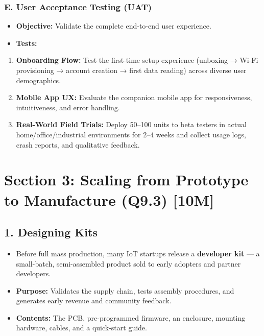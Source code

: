 \subsubsection{E. User Acceptance Testing (UAT)}
\begin{itemize}
  \item   \textbf{Objective:} Validate the complete end-to-end user experience.
  \item   \textbf{Tests:}
\end{itemize}
\begin{enumerate}
  \item \textbf{Onboarding Flow:} Test the first-time setup experience (unboxing → Wi-Fi provisioning → account creation → first data reading) across diverse user demographics.
  \item \textbf{Mobile App UX:} Evaluate the companion mobile app for responsiveness, intuitiveness, and error handling.
  \item \textbf{Real-World Field Trials:} Deploy 50–100 units to beta testers in actual home/office/industrial environments for 2–4 weeks and collect usage logs, crash reports, and qualitative feedback.
\end{enumerate}


\section{Section 3: Scaling from Prototype to Manufacture (Q9.3) [10M]}

\subsection{1. Designing Kits}
\begin{itemize}
  \item   Before full mass production, many IoT startups release a \textbf{developer kit} — a small-batch, semi-assembled product sold to early adopters and partner developers.
  \item   \textbf{Purpose:} Validates the supply chain, tests assembly procedures, and generates early revenue and community feedback.
  \item   \textbf{Contents:} The PCB, pre-programmed firmware, an enclosure, mounting hardware, cables, and a quick-start guide.
\end{itemize}



